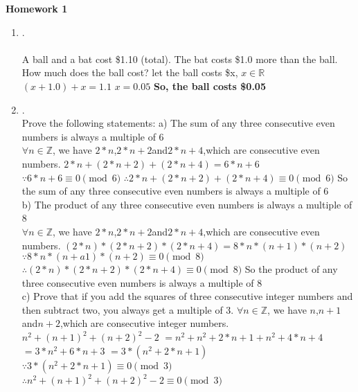 \documentclass{article}
\theoremstyle{definition}
\theoremstyle{plain}
\begin{document}
\begin{center} \bf \LARGE Homework 1\\
\end{center}


\begin {enumerate}[itemindent=30pt,label=\bf Exercise {\arabic*}:]

\item .
\\
\\ A ball and a bat cost \$1.10 (total). The bat costs \$1.0 more than the ball. How much does the ball cost?
\subitem let the ball costs \$x, $x \in \mathbb{R}$
\subitem \;\;$(x + 1.0) + x  = 1.1$
\subitem \;\;$x = 0.05$
\subitem \textbf{So, the ball costs \$0.05}
\\
\item .
\\Prove the following statements:
\subitem a) The sum of any three consecutive even numbers is always a multiple of 6\\
\subitem \;\;\;\;$\forall n \in \mathbb{Z}$, we have $2*n$,\;\;$2*n+2$\;\;and\;\;$2*n+4$,\;\;which are consecutive even numbers.
\subitem \;\;\;\;$2*n+(2*n+2)+(2*n+4) = 6*n+6$
\subitem \;\;\;\;$\because 6*n+6 \equiv 0 \pmod 6$
\subitem \;\;\;\;$\therefore 2*n+(2*n+2)+(2*n+4) \equiv 0 \pmod 6$
\subitem \;\;\;\;So the sum of any three consecutive even numbers is always a multiple of 6 
\\
\subitem b) The product of any three consecutive even numbers is always a multiple of 8\\
\subitem \;\;\;\;$\forall n \in \mathbb{Z}$, we have $2*n$,\;\;$2*n+2$\;\;and\;\;$2*n+4$,\;\;which are consecutive even numbers.
\subitem \;\;\;\;$(2*n)*(2*n+2)*(2*n+4) = 8*n*(n+1)*(n+2)$
\subitem \;\;\;\;$\because 8*n*(n+a1)*(n+2) \equiv 0 \pmod 8$
\subitem \;\;\;\;$\therefore (2*n)*(2*n+2)*(2*n+4) \equiv 0 \pmod 8$
\subitem \;\;\;\; So the product of any three consecutive even numbers is always a multiple of 8
\\
\subitem c) Prove that if you add the squares of three consecutive integer numbers and then subtract two, you always get a multiple of 3.
\subitem \;\;\;\;$\forall n \in \mathbb{Z}$, we have $n$,\;\;$n+1$\;\;and\;\;$n+2$,\;\;which are consecutive integer numbers.
\subitem \;\;\;\;$n^2+(n+1)^2+(n+2)^2-2$
\subitem \;\;\;\;$=n^2+n^2+2*n+1+n^2+4*n+4$
\subitem \;\;\;\;$=3*n^2+6*n+3$
\subitem \;\;\;\;$=3*(n^2+2*n+1)$
\subitem \;\;\;\;$\because 3*(n^2+2*n+1) \equiv 0 \pmod 3$
\subitem \;\;\;\;$\therefore n^2+(n+1)^2+(n+2)^2-2 \equiv 0 \pmod 3$

\end{enumerate}
\end{document}
